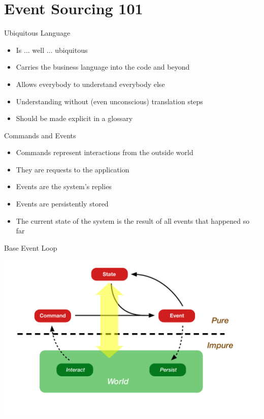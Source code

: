 \part{Event Sourcing 101}

\begin{frame}[fragile]{Ubiquitous Language}

  \begin{itemize}[<+->]
	\item Is $\ldots$ well $\ldots$ ubiquitous
	\item Carries the business language into the code and beyond
	\item Allows everybody to understand everybody else 
	\item Understanding without (even unconscious) translation steps
	\item Should be made explicit in a glossary
  \end{itemize}

\end{frame}

\begin{frame}[fragile]{Commands and Events}

  \begin{itemize}[<+->]
  \item Commands represent interactions from the outside world
  \item They are requests to the application
  \item Events  are the system's replies
  \item Events are persistently stored 
  \item The current state of the system is the result of all events that happened so far
  \end{itemize}
\end{frame}

\begin{frame}[fragile]{Base Event Loop}
\begin{center}
\includegraphics[width=\textwidth]{./images/event-loop.pdf}
\end{center}
\end{frame}

